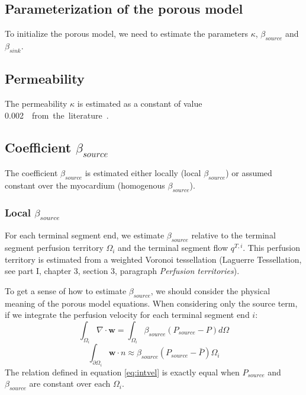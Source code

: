 \documentclass[a4paper, 11pt]{article} %
\begin{document}
\subsection{Parameterization of the porous model}
\label{subsec:parameter}

To initialize the porous model, we need to estimate the parameters $\kappa$, $\beta_{source}$ and $\beta_{sink}$.\\

\subsection*{Permeability}
The permeability $\kappa$ is estimated as a constant of value \SI{0.002}{\milli\meter\square\per\pascal\per\second} from the literature \cite{chapelle2010poroelastic}. %

\subsection*{Coefficient $\beta_{source}$}

The coefficient $\beta_{source}$ is estimated either locally (local $\beta_{source}$) or assumed constant over the myocardium (homogenous $\beta_{source}$).

\subsubsection*{Local $\beta_{source}$}

For each terminal segment end, we estimate $\beta_{source}$ relative to the terminal segment perfusion territory $\Omega_i$ and the terminal segment flow $q^{T,i}$. This perfusion territory is estimated from a weighted Voronoi tessellation (Laguerre Tessellation, see part I, chapter 3, section 3, paragraph \textit{Perfusion territories}). %

To get a sense of how to estimate $\beta_{source}$, we should consider the physical meaning of the porous model equations.
When considering only the source term, if we integrate the perfusion velocity for each terminal segment end $i$:
\begin{equation}
\int_{\Omega_i}\nabla \cdot \bm{w} = \int_{\Omega_i} \beta_{source} (P_{source} - P)d\Omega
\end{equation}
\begin{equation}
\int_{\partial \Omega_i} \bm{w} \cdot n \approx \beta_{source} (P_{source} - \bar{P}) \Omega_i
\label{eq:intvel}
\end{equation}
The relation defined in equation \ref{eq:intvel} is exactly equal when $P_{source}$ and $\beta_{source}$ are constant over each $\Omega_i$.
\end{document}
